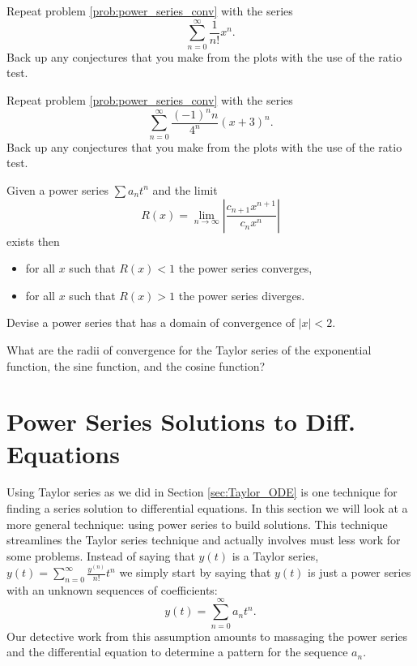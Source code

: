 \begin{problem}
    Repeat problem \ref{prob:power_series_conv} with the series
    \[ \sum_{n=0}^\infty \frac{1}{n!} x^n. \]
    Back up any conjectures that you make from the plots with the use of the ratio test.
\end{problem}

\begin{problem}
    Repeat problem \ref{prob:power_series_conv} with the series
    \[ \sum_{n=0}^\infty \frac{(-1)^n n}{4^n} (x+3)^n. \]
    Back up any conjectures that you make from the plots with the use of the ratio test.
\end{problem}



\begin{thm}
    Given a power series $\sum a_n t^n$ and the limit
    \[ R(x) = \lim_{n \to \infty} \left| \frac{c_{n+1}x^{n+1}}{c_{n}x^n} \right| \]
    exists then
    \begin{itemize}
        \item for all $x$ such that $R(x) < 1$ the power series converges,
        \item for all $x$ such that $R(x) > 1$ the power series diverges.
    \end{itemize}
\end{thm}

\begin{problem}
    Devise a power series that has a domain of convergence of $|x|<2$.
\end{problem}

\begin{problem}
    What are the radii of convergence for the Taylor series of the exponential function,
    the sine function, and the cosine function?
\end{problem}


\newpage\section{Power Series Solutions to Diff. Equations}
Using Taylor series as we did in Section \ref{sec:Taylor_ODE} is one technique for finding
a series solution to differential equations.  In this section we will look at a more
general technique: using power series to build solutions.  This technique streamlines the
Taylor series technique and actually involves must less work for some problems.  
Instead of
saying that $y(t)$ is a Taylor series, $y(t) = \sum_{n=0}^\infty \frac{y^{(n)}}{n!} t^n$
we simply start by saying that $y(t)$ is just a power series with an unknown sequences of
coefficients: 
\[ y(t) = \sum_{n=0}^\infty a_n t^n. \]  
Our detective work from this assumption amounts to massaging the power series and the
differential equation to determine a pattern for the sequence $a_n$.

